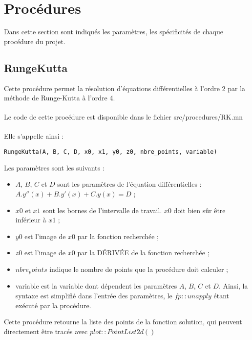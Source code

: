 \documentclass{report}
\begin{document}
\section{Procédures}
Dans cette section sont indiqués les paramètres, les spécificités de chaque procédure du projet.
\subsection{RungeKutta}
Cette procédure permet la résolution d'équations différentielles à l'ordre 2 par la méthode de Runge-Kutta à l'ordre 4.
\\
\\
Le code de cette procédure est disponible dans le fichier src/procedures/RK.mn
\\
\\
Elle s'appelle ainsi :  
\begin{verbatim}
RungeKutta(A, B, C, D, x0, x1, y0, z0, nbre_points, variable)
\end{verbatim}
Les paramètres sont les suivants : 
\begin{itemize}
	\item $A$, $B$, $C$ et $D$ sont les paramètres de l'équation différentielles : $A.y''(x) + B.y'(x) + C.y(x) = D$ ;
	\item $x0$ et $x1$ sont les bornes de l'intervalle de travail. $x0$ doit bien sûr être inférieur à $x1$ ;
	\item $y0$ est l'image de $x0$ par la fonction recherchée ;
	\item $z0$ est l'image de $x0$ par la DÉRIVÉE de la fonction recherchée ;
	\item $nbre_points$ indique le nombre de points que la procédure doit calculer ;
	\item variable est la variable dont dépendent les paramètres $A$, $B$, $C$ et $D$. Ainsi, la syntaxe est simplifié dans l'entrée des paramètres, le $fp::unapply$ étant exécuté par la procédure.
\end{itemize}
Cette procédure retourne la liste des points de la fonction solution, qui peuvent directement être tracés avec $plot::PointList2d()$
\end{document}

